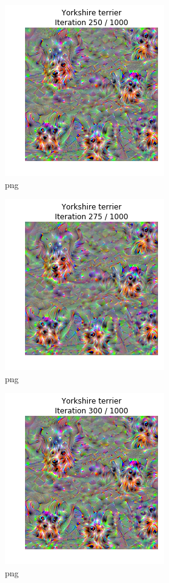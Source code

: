 \documentclass[]{book}
\theoremstyle{definition}
\theoremstyle{definition}
\theoremstyle{definition}
\theoremstyle{remark}
\begin{document}
\begin{figure}
\centering
\includegraphics{Network-Visualization-TensorFlow_files/Network-Visualization-TensorFlow_24_11.png}
\caption{png}
\end{figure}

\begin{figure}
\centering
\includegraphics{Network-Visualization-TensorFlow_files/Network-Visualization-TensorFlow_24_12.png}
\caption{png}
\end{figure}

\begin{figure}
\centering
\includegraphics{Network-Visualization-TensorFlow_files/Network-Visualization-TensorFlow_24_13.png}
\caption{png}
\end{figure}
\end{document}
